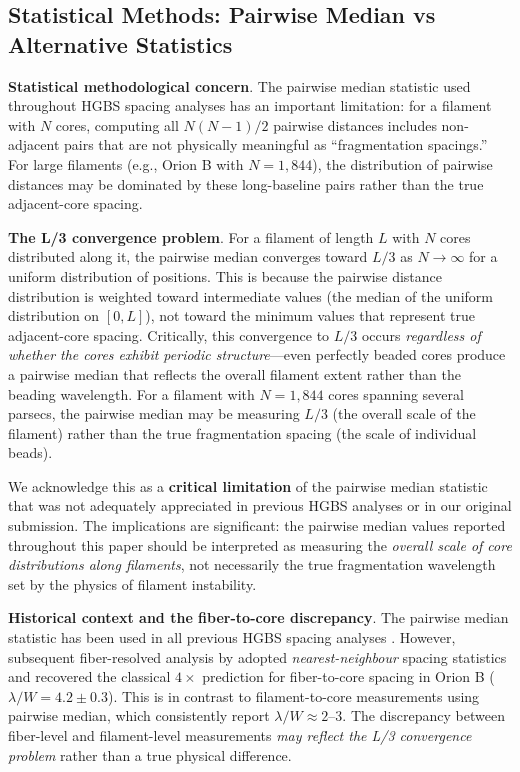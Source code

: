 \documentclass[twocolumn]{mnras}
\begin{document}
\subsection{Statistical Methods: Pairwise Median vs Alternative Statistics}
\label{sec:statistics}

\textbf{Statistical methodological concern}. The pairwise median statistic used throughout HGBS spacing analyses has an important limitation: for a filament with $N$ cores, computing all $N(N-1)/2$ pairwise distances includes non-adjacent pairs that are not physically meaningful as ``fragmentation spacings.'' For large filaments (e.g., Orion B with $N = 1,844$), the distribution of pairwise distances may be dominated by these long-baseline pairs rather than the true adjacent-core spacing.

\textbf{The L/3 convergence problem}. For a filament of length $L$ with $N$ cores distributed along it, the pairwise median converges toward $L/3$ as $N \to \infty$ for a uniform distribution of positions. This is because the pairwise distance distribution is weighted toward intermediate values (the median of the uniform distribution on $[0, L]$), not toward the minimum values that represent true adjacent-core spacing. Critically, this convergence to $L/3$ occurs \textit{regardless of whether the cores exhibit periodic structure}—even perfectly beaded cores produce a pairwise median that reflects the overall filament extent rather than the beading wavelength. For a filament with $N = 1,844$ cores spanning several parsecs, the pairwise median may be measuring $L/3$ (the overall scale of the filament) rather than the true fragmentation spacing (the scale of individual beads).

We acknowledge this as a \textbf{critical limitation} of the pairwise median statistic that was not adequately appreciated in previous HGBS analyses or in our original submission. The implications are significant: the pairwise median values reported throughout this paper should be interpreted as measuring the \textit{overall scale of core distributions along filaments}, not necessarily the true fragmentation wavelength set by the physics of filament instability.

\textbf{Historical context and the fiber-to-core discrepancy}. The pairwise median statistic has been used in all previous HGBS spacing analyses \citep{Arzoumanian2011, Arzoumanian2019}. However, subsequent fiber-resolved analysis by \citet{Hacar2013, Hacar2018} adopted \textit{nearest-neighbour} spacing statistics and recovered the classical $4\times$ prediction for fiber-to-core spacing in Orion B ($\lambda/W = 4.2 \pm 0.3$). This is in contrast to filament-to-core measurements using pairwise median, which consistently report $\lambda/W \approx 2$--$3$. The discrepancy between fiber-level and filament-level measurements \textit{may reflect the L/3 convergence problem} rather than a true physical difference.
\end{document}
